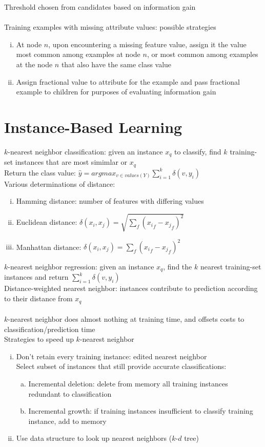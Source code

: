 \documentclass{article}
\begin{document}
		Threshold chosen from candidates based on information gain \\
		\\
		Training examples with missing attribute values: possible strategies
		\begin{enumerate}[(i)]
			\item At node $n$, upon encountering a missing feature value, assign it the value most common among examples at node $n$, or most common among examples at the node $n$ that also have the same class value
			\item Assign fractional value to attribute for the example and pass fractional example to children for purposes of evaluating information gain
			\end{enumerate}
		\clearpage

	\section{Instance-Based Learning}
		$k$-nearest neighbor classification: given an instance $x_q$ to classify, find $k$ training-set instances that are most simimlar or $x_q$ \\
		Return the class value: $\hat{y} = argmax_{v \in values(Y)} \sum_{i = 1}^k \delta(v, y_i)$ \\
		Various determinations of distance: 
		\begin{enumerate}[(i)]
			\item Hamming distance: number of features with differing values
			\item Euclidean distance: $\delta(x_i, x_j) = \sqrt{\sum_f ({x_i}_f - {x_j}_f)^2}$
			\item Manhattan distance: $\delta(x_i, x_j) = \sum_f ({x_i}_f - {x_j}_f)^2$
			\end{enumerate}
		$k$-nearest neighbor regression: given an instance $x_q$, find the $k$ nearest training-set instances and return $\sum_{i = 1}^k \delta(v, y_i)$ \\
		Distance-weighted nearest neighbor: instances contribute to prediction according to their distance from $x_q$ \\
		\\
		$k$-nearest neighbor does almost nothing at training time, and offsets costs to classification/prediction time \\
		Strategies to speed up $k$-nearest neighbor
		\begin{enumerate}[(i)]
			\item Don't retain every training instance: edited nearest neighbor \\
			Select subset of instances that still provide accurate classifications: \\
			\begin{enumerate}[(a)]
				\item Incremental deletion: delete from memory all training instances redundant to classification
				\item Incremental growth: if training instances insufficient to classify training instance, add to memory
				\end{enumerate}
			\item Use data structure to look up nearest neighbors ($k$-$d$ tree)
			\end{enumerate}
\end{document}
